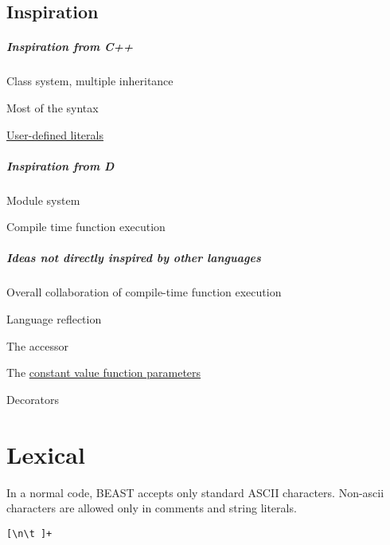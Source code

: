 \section{Inspiration}
\paragraph{Inspiration from C++}
\begin{compactitem}
	\item Class system, multiple inheritance
	\item Most of the syntax
	\item \hyperref[userDefinedLiterals]{User-defined literals}
\end{compactitem}

\paragraph{Inspiration from D}
\begin{compactitem}
	\item Module system
	\item Compile time function execution
\end{compactitem}

\paragraph{Ideas not directly inspired by other languages}
\begin{compactitem}
	\item Overall collaboration of compile-time function execution
	\item Language reflection
	\item The \hyperref[colonAccessor]{\kwd{:}} accessor
	\item The \hyperref[constantValueParameter]{constant value function parameters}	
	\item Decorators
\end{compactitem}

\chapter{Lexical}
In a normal code, BEAST accepts only standard ASCII characters. Non-ascii characters are allowed only in comments and string literals.

\begin{grammar}
	 \verb|[\n\t ]+|
\end{grammar}

